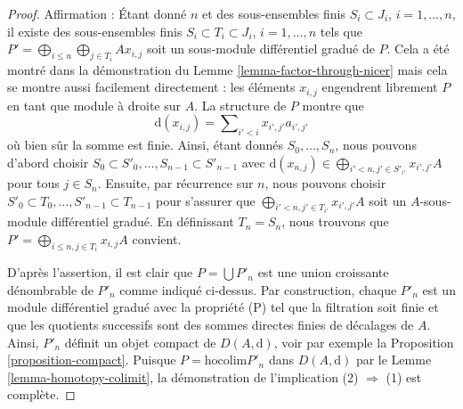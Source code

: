 \begin{proof}
\medskip\noindent
Affirmation : Étant donné $n$ et des sous-ensembles finis $S_i \subset J_i$, $i =
1, \ldots, n$, il existe des sous-ensembles finis $S_i \subset T_i \subset J_i$,
$i = 1, \ldots, n$ tels que $P' = \bigoplus_{i \leq n} \bigoplus_{j \in T_i}
Ax_{i, j}$ soit un sous-module différentiel gradué de $P$. Cela a été montré dans
la démonstration du Lemme \ref{lemma-factor-through-nicer} mais cela se montre aussi
facilement directement : les éléments $x_{i, j}$ engendrent librement $P$ en
tant que module à droite sur $A$. La structure de $P$ montre que
$$
\text{d}(x_{i, j}) = \sum\nolimits_{i' < i} x_{i', j'}a_{i', j'}
$$
où bien sûr la somme est finie. Ainsi, étant donnés $S_0, \ldots, S_n$, nous pouvons
d'abord choisir $S_0 \subset S'_0, \ldots, S_{n - 1} \subset S'_{n - 1}$ avec
$\text{d}(x_{n, j}) \in \bigoplus_{i' < n, j' \in S'_{i'}} x_{i', j'}A$ pour tous
$j \in S_n$. Ensuite, par récurrence sur $n$, nous pouvons choisir $S'_0 \subset
T_0, \ldots, S'_{n - 1} \subset T_{n - 1}$ pour s'assurer que $\bigoplus_{i' < n,
j' \in T_{i'}} x_{i', j'}A$ soit un $A$-sous-module différentiel gradué. En
définissant $T_n = S_n$, nous trouvons que $P' = \bigoplus_{i \leq n, j \in T_i}
x_{i, j}A$ convient.

\medskip\noindent
D'après l'assertion, il est clair que $P = \bigcup P'_n$ est une union croissante
dénombrable de $P'_n$ comme indiqué ci-dessus. Par construction, chaque $P'_n$ est
un module différentiel gradué avec la propriété (P) tel que la filtration soit
finie et que les quotients successifs sont des sommes directes finies de décalages
de $A$. Ainsi, $P'_n$ définit un objet compact de $D(A, \text{d})$, voir par
exemple la Proposition \ref{proposition-compact}. Puisque $P = \text{hocolim}
P'_n$ dans $D(A, \text{d})$ par le Lemme \ref{lemma-homotopy-colimit}, la
démonstration de l'implication (2) $\Rightarrow$ (1) est complète.
\end{proof}










